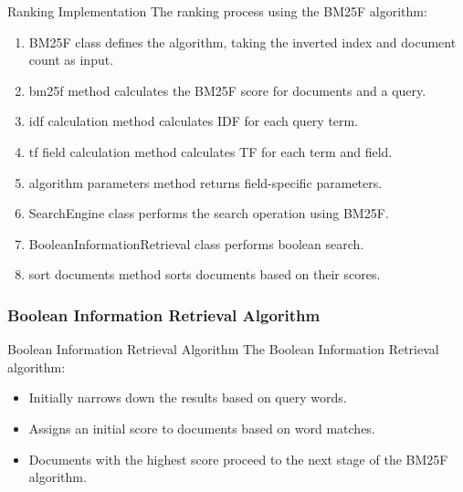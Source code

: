 \documentclass{beamer}
\begin{document}
\begin{frame}{Ranking Implementation}
    The ranking process using the BM25F algorithm:
    \begin{enumerate}
    \item BM25F class defines the algorithm, taking the inverted index and document count as input.
    \item bm25f method calculates the BM25F score for documents and a query.
    \item idf calculation method calculates IDF for each query term.
    \item tf field calculation method calculates TF for each term and field.
    \item algorithm parameters method returns field-specific parameters.
    \item SearchEngine class performs the search operation using BM25F.
    \item BooleanInformationRetrieval class performs boolean search.
    \item sort documents method sorts documents based on their scores.
    \end{enumerate}
\end{frame}

\subsubsection{Boolean Information Retrieval Algorithm}

    \begin{frame}{Boolean Information Retrieval Algorithm}
    The Boolean Information Retrieval algorithm:
    \begin{itemize}
    \item Initially narrows down the results based on query words.
    \item Assigns an initial score to documents based on word matches.
    \item Documents with the highest score proceed to the next stage of the BM25F algorithm.
    \end{itemize}
    \end{frame}
    
\end{document}
